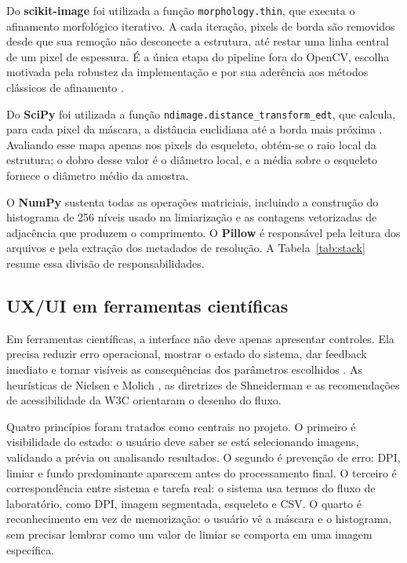 \documentclass[12pt]{article}
\begin{document}
Do \textbf{scikit-image} \cite{vanderwalt2014skimage} foi utilizada a função \texttt{morphology.thin}, que executa o afinamento morfológico iterativo. A cada iteração, pixels de borda são removidos desde que sua remoção não desconecte a estrutura, até restar uma linha central de um pixel de espessura. É a única etapa do pipeline fora do OpenCV, escolha motivada pela robustez da implementação e por sua aderência aos métodos clássicos de afinamento \cite{zhang1984thinning,guo1989parallel}.

Do \textbf{SciPy} \cite{virtanen2020scipy} foi utilizada a função \texttt{ndimage.distance\_transform\_edt}, que calcula, para cada pixel da máscara, a distância euclidiana até a borda mais próxima \cite{felzenszwalb2012distance}. Avaliando esse mapa apenas nos pixels do esqueleto, obtém-se o raio local da estrutura; o dobro desse valor é o diâmetro local, e a média sobre o esqueleto fornece o diâmetro médio da amostra.

O \textbf{NumPy} \cite{harris2020array} sustenta todas as operações matriciais, incluindo a construção do histograma de 256 níveis usado na limiarização e as contagens vetorizadas de adjacência que produzem o comprimento. O \textbf{Pillow} \cite{clark2015pillow} é responsável pela leitura dos arquivos e pela extração dos metadados de resolução. A Tabela~\ref{tab:stack} resume essa divisão de responsabilidades.

\subsection{UX/UI em ferramentas científicas}

Em ferramentas científicas, a interface não deve apenas apresentar controles. Ela precisa reduzir erro operacional, mostrar o estado do sistema, dar feedback imediato e tornar visíveis as consequências dos parâmetros escolhidos \cite{nielsen1990heuristic,shneiderman2010designing}. As heurísticas de Nielsen e Molich \cite{nielsen1990heuristic}, as diretrizes de Shneiderman \cite{shneiderman2010designing} e as recomendações de acessibilidade da W3C \cite{wcag2018} orientaram o desenho do fluxo.

Quatro princípios foram tratados como centrais no projeto. O primeiro é visibilidade do estado: o usuário deve saber se está selecionando imagens, validando a prévia ou analisando resultados. O segundo é prevenção de erro: DPI, limiar e fundo predominante aparecem antes do processamento final. O terceiro é correspondência entre sistema e tarefa real: o sistema usa termos do fluxo de laboratório, como DPI, imagem segmentada, esqueleto e CSV. O quarto é reconhecimento em vez de memorização: o usuário vê a máscara e o histograma, sem precisar lembrar como um valor de limiar se comporta em uma imagem específica.
\end{document}
